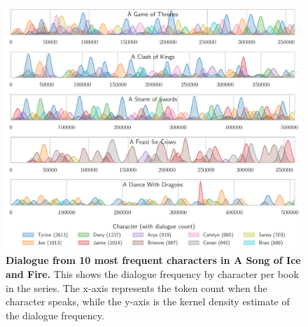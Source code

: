 \documentclass[fleqn,moreauthors,10pt]{ds_report}
\begin{document}
\begin{figure}[H]
	\centering
	\includegraphics[width=\linewidth]{asoif_dialogue.pdf}
	\caption{\textbf{Dialogue from 10 most frequent characters in A Song of Ice and Fire.} This shows the dialogue frequency by character per book in the series. The x-axis represents the token count when the character speaks, while the y-axis is the kernel density estimate of the dialogue frequency.}
	\label{fig:asoif_dialogue}
\end{figure}
\end{document}
